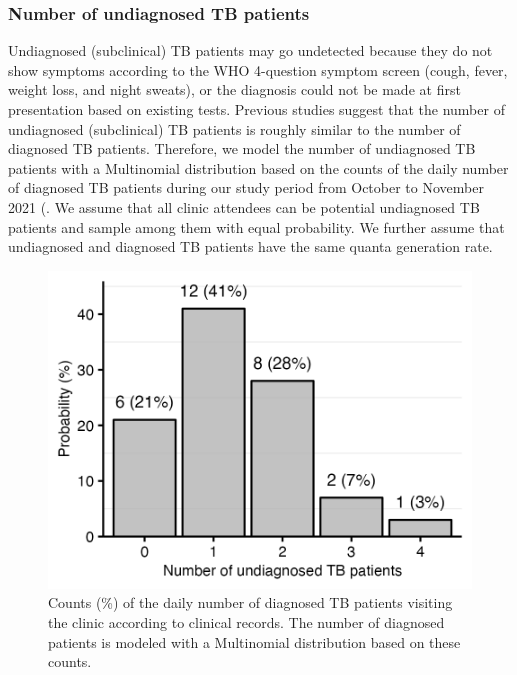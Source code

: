 \documentclass[fleqn,11pt]{wlscirep_supp}
\begin{document}
\subsubsection{Number of undiagnosed TB patients}

Undiagnosed (subclinical) TB patients may go undetected because they do not show symptoms according to the WHO 4-question symptom screen (cough, fever, weight loss, and night sweats), or the diagnosis could not be made at first presentation based on existing tests\cite{Patterson2024PNAS}. Previous studies suggest that the number of undiagnosed (subclinical) TB patients is roughly similar to the number of diagnosed TB patients\cite{Berhanu2023CID,Moyo2022LancetID}. Therefore, we model the number of undiagnosed TB patients with a Multinomial distribution based on the counts of the daily number of diagnosed TB patients during our study period from October to November 2021 (. We assume that all clinic attendees can be potential undiagnosed TB patients and sample among them with equal probability. We further assume that undiagnosed and diagnosed TB patients have the same quanta generation rate.

\begin{figure}[!htpb]
    \centering
    \includegraphics{results/inputs/undiagnosed-tb-patients.png}
    \caption{Counts (\%) of the daily number of diagnosed TB patients visiting the clinic according to clinical records. The number of diagnosed patients is modeled with a Multinomial distribution based on these counts.}
    \label{fig:undiagnosed-distribution}
\end{figure}
\end{document}

